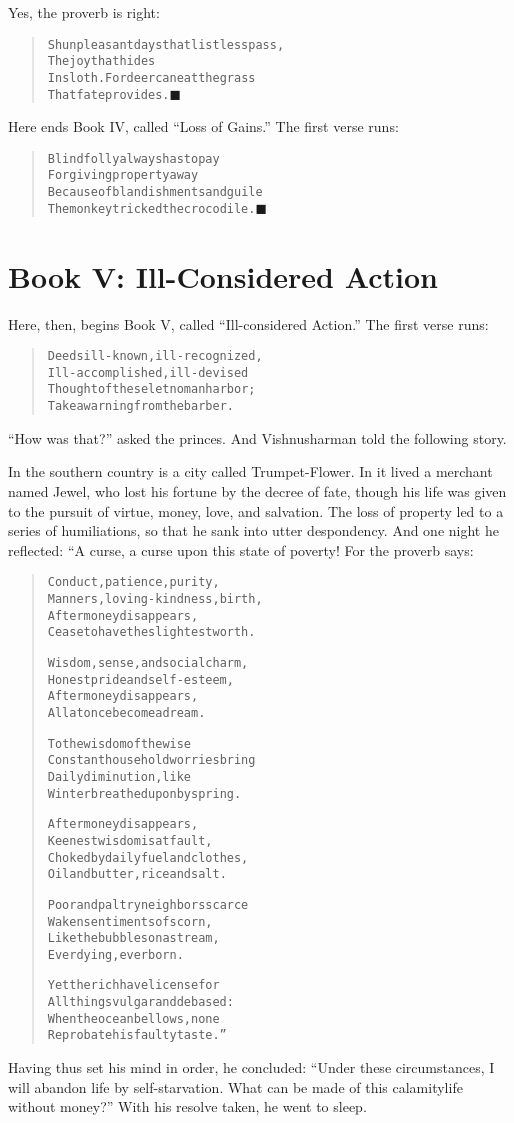 \documentclass[article, twoside, 14pt]{memoir}
\newcommand{\qed}{\hfill \ensuremath{\blacksquare}}
\renewenvironment{verbatim}{%
\begin{quote}%
\vskip -10pt%
\begin{alltt}\normalfont\large}{\end{alltt}%
\end{quote}%
\vskip -10pt
} %
\begin{document}
Yes, the proverb is right:

\begin{verbatim}
Shun pleasant days that listless pass,
    The joy that hides
In sloth. For deer can eat the grass
    That fate provides.\hyperref[s66]{\qed}
\end{verbatim}
Here ends Book IV, called ``Loss of Gains.'' The first verse runs:

\begin{verbatim}
Blind folly always has to pay
For giving property away
Because of blandishments and guile{\textemdash}
The monkey tricked the crocodile.\hyperref[s65]{\qed}
\end{verbatim}
\part{Book V: Ill-Considered Action}

\label{s78}

Here, then, begins Book V, called ``Ill-considered Action.''
The first verse runs:

\begin{verbatim}
Deeds ill-known, ill-recognized,
Ill-accomplished, ill-devised{\textemdash}
Thought of these let no man harbor;
Take a warning from the barber.
\end{verbatim}
``How was that?'' asked the princes. And Vishnusharman told the
following story.

In the southern country is a city called \label{s79}Trumpet-Flower.
In it lived a merchant named Jewel, who lost his fortune by the
decree of fate, though his life was given to the pursuit of virtue,
money, love, and salvation. The loss of property led to a series of
humiliations, so that he sank into utter despondency. And one night
he reflected: “A curse, a curse upon this state of poverty! For the
proverb says:

\begin{verbatim}
Conduct, patience, purity,
    Manners, loving-kindness, birth,
After money disappears,
    Cease to have the slightest worth.

Wisdom, sense, and social charm,
    Honest pride and self-esteem,
After money disappears,
    All at once become a dream.

To the wisdom of the wise
    Constant household worries bring
Daily diminution, like
    Winter breathed upon by spring.

After money disappears,
    Keenest wisdom is at fault,
Choked by daily fuel and clothes,
    Oil and butter, rice and salt.

Poor and paltry neighbors scarce
    Waken sentiments of scorn,
Like the bubbles on a stream,
    Ever dying, ever born.

Yet the rich have license for
    All things vulgar and debased:
When the ocean bellows, none
    Reprobate his faulty taste.”
\end{verbatim}
Having thus set his mind in order, he concluded:
``Under these circumstances, I will abandon life by self-starvation. What can be made of this calamity{\textemdash}life without money?''
With his resolve taken, he went to sleep.
\end{document}

